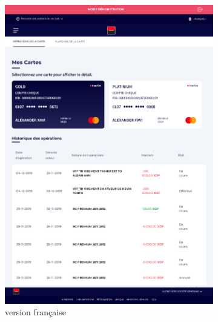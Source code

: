 \begin{figure}[!ht]
    \centering
    \begin{subfigure}[b]{0.49\textwidth}
        \centering
        \includegraphics[width=\textwidth]{images/screens/cartes/tablette.png}
        \caption{version française}
    \end{subfigure}
    \hfill
    \begin{subfigure}[b]{0.49\textwidth}
        \centering

\end{subfigure}
\end{figure}
